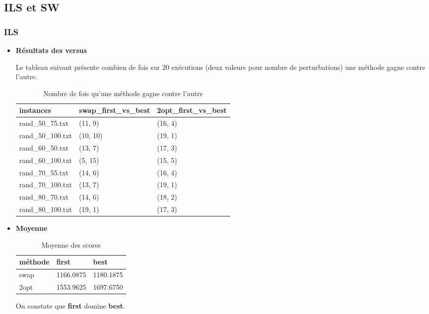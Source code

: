 \subsection{ILS et SW}

\subsubsection{ILS}
\begin{itemize}
	\item \textbf{Résultats des versus}
	
	Le tableau suivant présente combien de fois sur 20 exécutions (deux valeurs pour nombre de perturbations) une méthode gagne contre l'autre. 
	
	\begin{table}[ht]
		\centering
		\caption{Nombre de fois qu'une méthode gagne contre l'autre}
		\begin{tabular}[t]
			{m{0.2\textwidth}m{}m{}}
			\toprule
			instances &	swap\_first\_vs\_best &	2opt\_first\_vs\_best \\
			
			\midrule
			rand\_50\_75.txt&	(11, 9)	&(16, 4)\\
			rand\_50\_100.txt&	(10, 10)&	(19, 1)\\
			rand\_60\_50.txt&	(13, 7)&	(17, 3)\\
			rand\_60\_100.txt&	(5, 15)&	(15, 5)\\
			rand\_70\_55.txt&	(14, 6)&	(16, 4)\\
			rand\_70\_100.txt&	(13, 7)	&(19, 1)\\
			rand\_80\_70.txt&	(14, 6)&	(18, 2)\\
			rand\_80\_100.txt&	(19, 1)&	(17, 3)\\
			
		
			\bottomrule
		\end{tabular}
	\end{table}
\item \textbf{Moyenne }

\begin{table}[ht]
	\rowcolors{2}{gray!10}{white}
	\centering
	\caption{Moyenne des scores}
	\begin{tabular}[t]
		{m{}m{}m{}}
		\toprule
		méthode &		first&		best\\
		\midrule
		swap&		1166.0875&	1180.1875\\
		2opt&		1553.9625& 1697.6750 \\
		
		\bottomrule
	\end{tabular}
\end{table}
On constate que \textbf{first} domine \textbf{best}.
\end{itemize}



